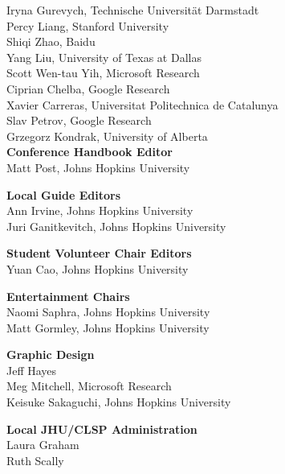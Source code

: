 Iryna Gurevych, Technische Universität Darmstadt  \\
Percy Liang, Stanford University  \\
Shiqi Zhao, Baidu  \\
Yang Liu, University of Texas at Dallas  \\
Scott Wen-tau Yih, Microsoft Research  \\
Ciprian Chelba, Google Research  \\
Xavier Carreras, Universitat Politechnica de Catalunya  \\
Slav Petrov, Google Research  \\
Grzegorz Kondrak, University of Alberta  \\

{\bf Conference Handbook Editor} \\
Matt Post, Johns Hopkins University \\

{\bf Local Guide Editors} \\
Ann Irvine, Johns Hopkins University \\
Juri Ganitkevitch, Johns Hopkins University \\

{\bf Student Volunteer Chair Editors} \\
Yuan Cao, Johns Hopkins University \\

{\bf Entertainment Chairs} \\
Naomi Saphra, Johns Hopkins University\\
Matt Gormley, Johns Hopkins University\\

{\bf Graphic Design} \\
Jeff Hayes\\
Meg Mitchell, Microsoft Research\\
Keisuke Sakaguchi, Johns Hopkins University\\

{\bf Local JHU/CLSP Administration} \\
Laura Graham\\
Ruth Scally\\
